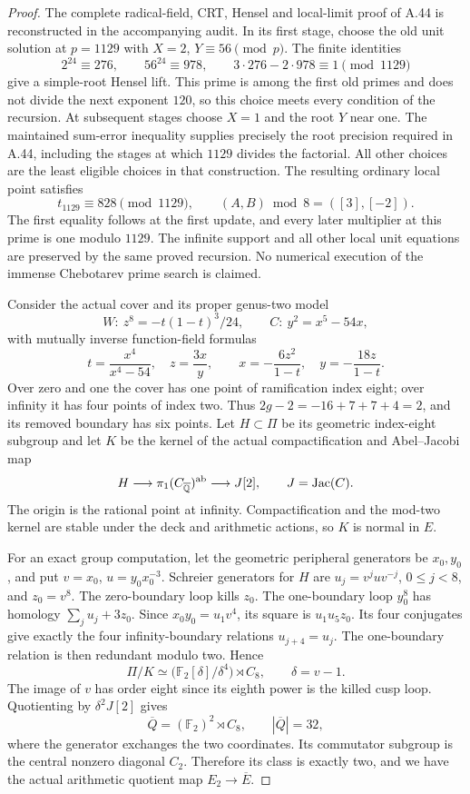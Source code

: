 \begin{proof}
The complete radical-field, CRT, Hensel and local-limit proof of
A.44 is reconstructed in the accompanying audit. In its first
stage, choose the old unit solution at \(p=1129\) with
\(X=2\), \(Y\equiv56\pmod p\). The finite identities
\[
 2^{24}\equiv276,\qquad56^{24}\equiv978,\qquad
 3\cdot276-2\cdot978\equiv1\pmod{1129}
\]
give a simple-root Hensel lift. This prime is among the first
old primes and does not divide the next exponent \(120\), so
this choice meets every condition of the recursion. At subsequent
stages choose \(X=1\) and the root \(Y\) near one. The
maintained sum-error inequality supplies precisely the root
precision required in A.44, including the stages at which
\(1129\) divides the factorial. All other choices are the least
eligible choices in that construction. The resulting ordinary
local point satisfies
\[
       t_{1129}\equiv828\pmod{1129},
       \qquad (A,B)\bmod8=([3],[-2]).
\]
The first equality follows at the first update, and every later
multiplier at this prime is one modulo \(1129\). The infinite
support and all other local unit equations are preserved by the
same proved recursion. No numerical execution of the immense
Chebotarev prime search is claimed.

Consider the actual cover and its proper genus-two model
\[
 W:\ z^8=-t(1-t)^3/24,
 \qquad C:\ y^2=x^5-54x,
\]
with mutually inverse function-field formulas
\[
 t=\frac{x^4}{x^4-54},\quad z=\frac{3x}{y},\qquad
 x=-\frac{6z^2}{1-t},\quad y=-\frac{18z}{1-t}.
\]
Over zero and one the cover has one point of ramification index
eight; over infinity it has four points of index two. Thus
\(2g-2=-16+7+7+4=2\), and its removed boundary has six points.
Let \(H\subset\Pi\) be its geometric index-eight subgroup and
let \(K\) be the kernel of the actual compactification and
Abel--Jacobi map
\[
 H\longrightarrow\pi_1(C_{\overline{\mathbb Q}})^{\rm ab}
       \longrightarrow J[2],\qquad J=\operatorname{Jac}(C).
\]
The origin is the rational point at infinity. Compactification and
the mod-two kernel are stable under the deck and arithmetic
actions, so \(K\) is normal in \(E\).

For an exact group computation, let the geometric peripheral
generators be \(x_0,y_0\), and put \(v=x_0\),
\(u=y_0x_0^{-3}\). Schreier generators for \(H\) are
\(u_j=v^juv^{-j}\), \(0\le j<8\), and \(z_0=v^8\).
The zero-boundary loop kills \(z_0\). The one-boundary loop
\(y_0^8\) has homology \(\sum_j u_j+3z_0\). Since
\(x_0y_0=u_1v^4\), its square is \(u_1u_5z_0\).
Its four conjugates give exactly the four infinity-boundary
relations \(u_{j+4}=u_j\). The one-boundary relation is then
redundant modulo two. Hence
\[
 \Pi/K\simeq\bigl(\mathbb F_2[\delta]/\delta^4\bigr)
      \rtimes C_8,\qquad\delta=v-1.
\]
The image of \(v\) has order eight since its eighth power is
the killed cusp loop. Quotienting by \(\delta^2J[2]\) gives
\[
       \overline Q=(\mathbb F_2)^2\rtimes C_8,
       \qquad |\overline Q|=32,
\]
where the generator exchanges the two coordinates. Its
commutator subgroup is the central nonzero diagonal \(C_2\).
Therefore its class is exactly two, and we have the actual
arithmetic quotient map \(E_2\to\overline E\).


\end{proof}
